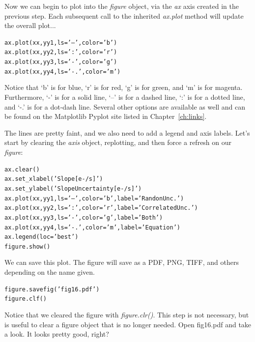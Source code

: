 Now we can begin to plot into the \textit{figure} object, via the \textit{ax} 
axis created in the previous step. Each subsequent call to the inherited 
\textit{ax.plot} method will update the overall plot... 

\begin{alltt}
\pytab ax.plot(xx, yy1, ls='--', color='b')
\pytab ax.plot(xx, yy2, ls=':', color='r')
\pytab ax.plot(xx, yy3, ls='-', color='g')
\pytab ax.plot(xx, yy4, ls='-.', color='m')
\end{alltt}

Notice that `b' is for blue, `r' is for red, `g' is for green, and `m'
is for magenta.  Furthermore, `-' is for a solid line, `--' is for a
dashed line, `:' is for a dotted line, and `-.' is for a dot-dash
line.  Several other options are available as well and can be found on
the Matplotlib Pyplot site listed in Chapter~\ref{ch:links}. 

The lines are pretty faint, and we also need to add a legend and axis
labels. Let's start by clearing the \textit{axis} object, replotting, and then 
force a refresh on our \textit{figure}:

\begin{alltt}
\pytab ax.clear()
\pytab ax.set_xlabel('Slope [e-/s]')
\pytab ax.set_ylabel('Slope Uncertainty [e-/s]')
\pytab ax.plot(xx, yy1, ls='--', color='b', label='Randon Unc.')
\pytab ax.plot(xx, yy2, ls=':', color='r', label='Correlated Unc.')
\pytab ax.plot(xx, yy3, ls='-', color='g', label='Both')
\pytab ax.plot(xx, yy4, ls='-.', color='m', label='Equation')
\pytab ax.legend(loc='best')
\pytab figure.show()
\end{alltt}

We can save this plot.  The figure will save as a PDF, PNG, TIFF, and
others depending on the name given.

\begin{alltt}
\pytab figure.savefig('fig16.pdf')
\pytab figure.clf()
\end{alltt}

Notice that we cleared the figure with \textit{figure.clr()}. This step is not 
necessary, but is useful to clear a figure object that is no longer needed. 
Open fig16.pdf and take a look.  It looks pretty good, right?


